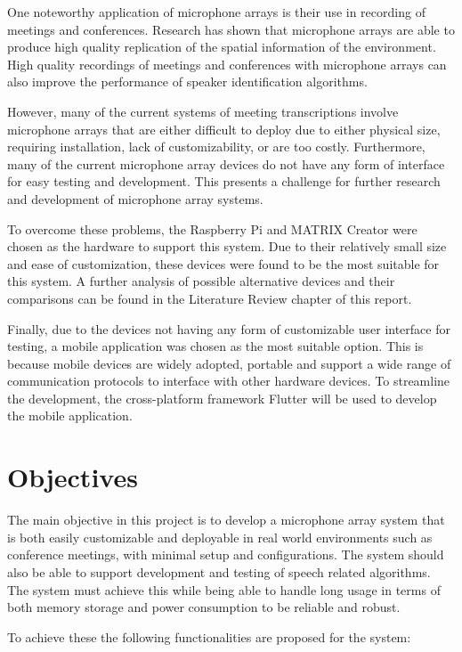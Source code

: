 \documentclass[hidelinks,12pt]{report} %
\begin{document}
One noteworthy application of microphone arrays is their use in recording of meetings and conferences. Research has shown that microphone arrays are able to produce high quality replication of the spatial information of the environment\cite{2}. High quality recordings of meetings and conferences with microphone arrays can also improve the performance of speaker identification algorithms\cite{3}.

However, many of the current systems of meeting transcriptions involve microphone arrays that are either difficult to deploy due to either physical size, requiring installation, lack of customizability, or are too costly. Furthermore, many of the current microphone array devices do not have any form of interface for easy testing and development. This presents a challenge for further research and development of microphone array systems.

To overcome these problems, the Raspberry Pi and MATRIX Creator were chosen as the hardware to support this system. Due to their relatively small size and ease of customization, these devices were found to be the most suitable for this system. A further analysis of possible alternative devices and their comparisons can be found in the Literature Review chapter of this report. 

Finally, due to the devices not having any form of customizable user interface for testing, a mobile application was chosen as the most suitable option. This is because mobile devices are widely adopted, portable and support a wide range of communication protocols to interface with other hardware devices. To streamline the development, the cross-platform framework Flutter will be used to develop the mobile application.

\section{Objectives}

The main objective in this project is to develop a microphone array system that is both easily customizable and deployable in real world environments such as conference meetings, with minimal setup and configurations. The system should also be able to support development and testing of speech related algorithms. The system must achieve this while being able to handle long usage in terms of both memory storage and power consumption to be reliable and robust.

To achieve these the following functionalities are proposed for the system:
\end{document}
